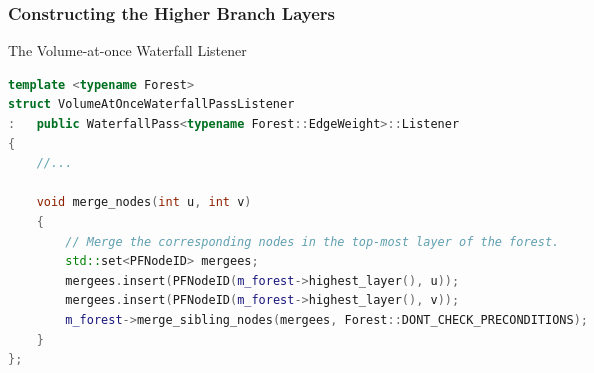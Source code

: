 \subsubsection{Constructing the Higher Branch Layers}

\begin{stulisting}[p]
\caption{The Volume-at-once Waterfall Listener}
\label{code:segmentation-ipfconstruction-volumeatonce-waterfalllistener}
\begin{lstlisting}[style=Default,language=C++]
template <typename Forest>
struct VolumeAtOnceWaterfallPassListener
:	public WaterfallPass<typename Forest::EdgeWeight>::Listener
{
	//...

	void merge_nodes(int u, int v)
	{
		// Merge the corresponding nodes in the top-most layer of the forest.
		std::set<PFNodeID> mergees;
		mergees.insert(PFNodeID(m_forest->highest_layer(), u));
		mergees.insert(PFNodeID(m_forest->highest_layer(), v));
		m_forest->merge_sibling_nodes(mergees, Forest::DONT_CHECK_PRECONDITIONS);
	}
};
\end{lstlisting}
\end{stulisting}

